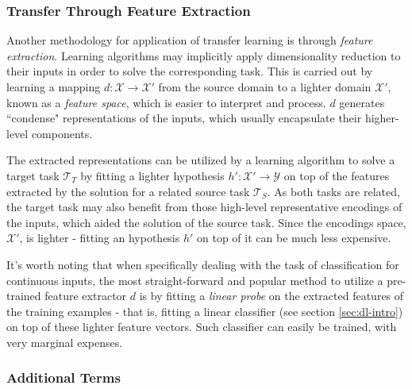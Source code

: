 \documentclass{article}
\begin{document}
\subsubsection{Transfer Through Feature Extraction}

\medskip
\noindent
Another methodology for application of transfer learning is through \emph{feature extraction}. Learning algorithms may implicitly apply dimensionality reduction to their inputs in order to solve the corresponding task. This is carried out by learning a mapping $d: \mathcal{X} \rightarrow \mathcal{X'}$ from the source domain to a lighter domain $\mathcal{X'}$, known as a \emph{feature space}, which is easier to interpret and process. $d$ generates ``condense" representations of the inputs, which usually encapsulate their higher-level components. 

\medskip
\noindent
The extracted representations can be utilized by a learning algorithm to solve a target task $\mathcal{T}_T$ by fitting a lighter hypothesis $h': \mathcal{X'} \rightarrow \mathcal{Y}$ on top of the features extracted by the solution for a related source task $\mathcal{T}_S$. As both tasks are related, the target task may also benefit from those high-level representative encodings of the inputs, which aided the solution of the source task. Since the encodings space, $\mathcal{X}'$, is lighter - fitting an hypothesis $h'$ on top of it can be much less expensive.

\medskip
\noindent
It's worth noting that when specifically dealing with the task of classification for continuous inputs, the most straight-forward and popular method to utilize a pre-trained feature extractor $d$ is by fitting a \emph{linear probe} on the extracted features of the training examples - that is, fitting a linear classifier (see section \ref{sec:dl-intro}) on top of these lighter feature vectors. Such classifier can easily be trained, with very marginal expenses.

\subsubsection{Additional Terms}
\end{document}
